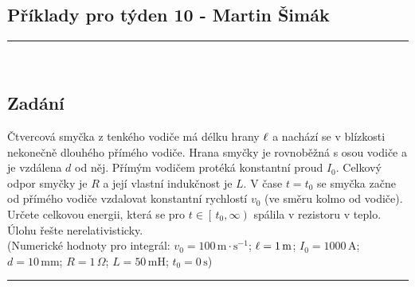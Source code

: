 \documentclass[12pt, a4paper]{article}
\def\endl{\\[3mm]}
\begin{document}
	
	\begin{center}
		\section*{Příklady pro týden 10 - Martin Šimák}
		\noindent\rule{13cm}{1.6pt} \\[5mm]
	\end{center}

	\subsection*{Zadání}
		Čtvercová  smyčka  z tenkého  vodiče  má  délku  hrany $\ell$ a  nachází  se  v blízkosti  nekonečně  dlouhého přímého vodiče. Hrana smyčky je rovnoběžná s osou vodiče a je vzdálena $d$ od něj. Přímým vodičem protéká konstantní proud $I_0$. Celkový odpor smyčky je $R$ a její vlastní indukčnost je $L$. V čase $t = t_0$ se smyčka začne od přímého vodiče vzdalovat konstantní rychlostí $v_0$ (ve směru kolmo od vodiče). Určete celkovou energii, která se pro $t \in \left[ \, t_0, \infty \right)$ spálila v rezistoru v teplo. Úlohu řešte nerelativisticky.
	\endl
		(Numerické hodnoty pro integrál: $v_0 = 100 \, \mathrm m \cdot \mathrm s^{-1}$; $\ell = 1 \, \mathrm m$; $I_0 = 1000 \, \mathrm A$; $d = 10 \, \mathrm{mm}$; $R = 1 \, \Omega$; $L = 50 \, \mathrm{mH}$; $t_0 = 0 \, \mathrm s$)
	\\
		\noindent\rule{8cm}{0.4pt}
	
\end{document}
